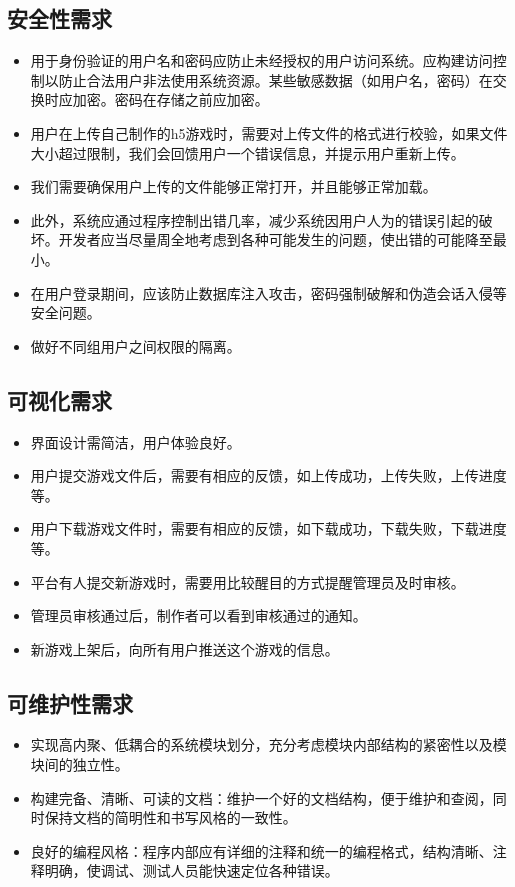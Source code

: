 \documentclass[12pt]{ctexart} %
\begin{document}
\subsection{安全性需求}
\begin{itemize}
  \item 用于身份验证的用户名和密码应防止未经授权的用户访问系统。应构建访问控制以防止合法用户非法使用系统资源。某些敏感数据（如用户名，密码）在交换时应加密。密码在存储之前应加密。
  \item 用户在上传自己制作的h5游戏时，需要对上传文件的格式进行校验，如果文件大小超过限制，我们会回馈用户一个错误信息，并提示用户重新上传。
  \item 我们需要确保用户上传的文件能够正常打开，并且能够正常加载。
  \item 此外，系统应通过程序控制出错几率，减少系统因用户人为的错误引起的破坏。开发者应当尽量周全地考虑到各种可能发生的问题，使出错的可能降至最小。
  \item 在用户登录期间，应该防止数据库注入攻击，密码强制破解和伪造会话入侵等安全问题。
  \item 做好不同组用户之间权限的隔离。
\end{itemize}

\subsection{可视化需求}
\begin{itemize}
  \item 界面设计需简洁，用户体验良好。
  \item 用户提交游戏文件后，需要有相应的反馈，如上传成功，上传失败，上传进度等。
  \item 用户下载游戏文件时，需要有相应的反馈，如下载成功，下载失败，下载进度等。
  \item 平台有人提交新游戏时，需要用比较醒目的方式提醒管理员及时审核。
  \item 管理员审核通过后，制作者可以看到审核通过的通知。
  \item 新游戏上架后，向所有用户推送这个游戏的信息。
\end{itemize}

\subsection{可维护性需求}
\begin{itemize}
  \item 实现高内聚、低耦合的系统模块划分，充分考虑模块内部结构的紧密性以及模块间的独立性。
  \item 构建完备、清晰、可读的文档：维护一个好的文档结构，便于维护和查阅，同时保持文档的简明性和书写风格的一致性。
  \item 良好的编程风格：程序内部应有详细的注释和统一的编程格式，结构清晰、注释明确，使调试、测试人员能快速定位各种错误。
\end{itemize}
\end{document}
